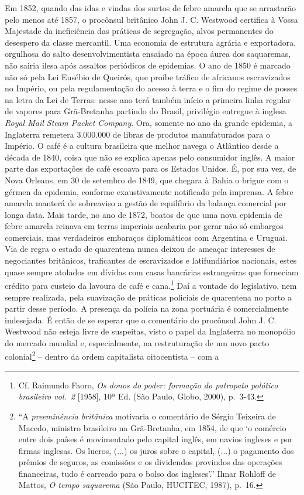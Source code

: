 Em 1852, quando das idas e vindas dos surtos de febre amarela que se
arrastarão pelo menos até 1857, o procônsul britânico John J. C.
Westwood certifica à Vossa Majestade da ineficiência das práticas de
segregação, alvos permanentes do desespero da classe mercantil. Uma
economia de estrutura agrária e exportadora, orgulhosa do salto
desenvolvimentista ensaiado na época áurea dos saquaremas, não sairia
ilesa após assaltos periódicos de epidemias. O ano de 1850 é marcado não
só pela Lei Eusébio de Queirós, que proíbe tráfico de africanos
escravizados no Império, ou pela regulamentação do acesso à terra e o
fim do regime de posses na letra da Lei de Terras: nesse ano terá também
início a primeira linha regular de vapores para Grã-Bretanha partindo do
Brasil, privilégio entregue à inglesa \emph{Royal Mail Steam Packet
Company}. Ora, somente no ano da grande epidemia, a Inglaterra remetera
3.000.000 de libras de produtos manufaturados para o Império. O café é a
cultura brasileira que melhor navega o Atlântico desde a década de 1840,
coisa que não se explica apenas pelo consumidor inglês. A maior parte
das exportações de café escoava para os Estados Unidos. É, por sua vez,
de Nova Orleans, em 30 de setembro de 1849, que chegara à Bahia o brigue
com o gérmen da epidemia, conforme exaustivamente notificado pela
imprensa. A febre amarela manterá de sobreaviso a gestão de equilíbrio
da balança comercial por longa data. Mais tarde, no ano de 1872, boatos
de que uma nova epidemia de febre amarela reinava em terras imperiais
acabaria por gerar não só embargos comerciais, mas verdadeiros embaraços
diplomáticos com Argentina e Uruguai. Via de regra o estado de
quarentena nunca deixou de ameaçar interesses de negociantes britânicos,
traficantes de escravizados e latifundiários nacionais, estes quase
sempre atolados em dívidas com casas bancárias estrangeiras que
forneciam crédito para custeio da lavoura de café e cana.\footnote{Cf.
  Raimundo Faoro, \emph{Os donos do poder: formação do patropato
  polótico brasileiro vol.~2} {[}1958{]}, 10ª Ed. (São Paulo, Globo,
  2000), p.~3-43.} Daí a vontade do legislativo, nem sempre realizada,
pela suavização de práticas policiais de quarentena no porto a partir
desse período. A presença da polícia na zona portuária é comercialmente
indesejada. É então de se esperar que o comentário do procônsul John J.
C. Westwood não esteja livre de suspeitas, visto o papel da Inglaterra
no monopólio do mercado mundial e, especialmente, na restruturação de um
novo pacto colonial\footnote{``A \emph{preeminência britânica} motivaria
  o comentário de Sérgio Teixeira de Macedo, ministro brasileiro na
  Grã-Bretanha, em 1854, de que `o comércio entre dois países é
  movimentado pelo capital inglês, em navios ingleses e por firmas
  inglesas. Os lucros, (...) os juros sobre o capital, (...) o pagamento
  dos prêmios de seguros, as comissões e os dividendos provindos das
  operações financeiras, tudo é carreado para o bolso dos ingleses'.''
  Ilmar Rohloff de Mattos, \emph{O tempo saquarema} (São Paulo, HUCITEC,
  1987), p.~16.} -- dentro da ordem capitalista oitocentista -- com a
